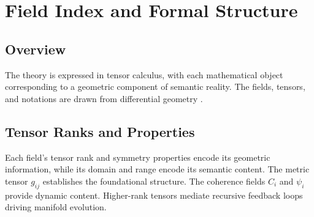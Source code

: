 \chapter{Field Index and Formal Structure}

\section{Overview}

The theory is expressed in tensor calculus, with each mathematical object corresponding to a geometric component of semantic reality. The fields, tensors, and notations are drawn from differential geometry \autocite{Riemann1868, Lee2003}.

\section{Tensor Ranks and Properties}

Each field's tensor rank and symmetry properties encode its geometric information, while its domain and range encode its semantic content. The metric tensor \(g_{ij}\) establishes the foundational structure. The coherence fields \(C_i\) and \(\psi_i\) provide dynamic content. Higher-rank tensors mediate recursive feedback loops driving manifold evolution.

